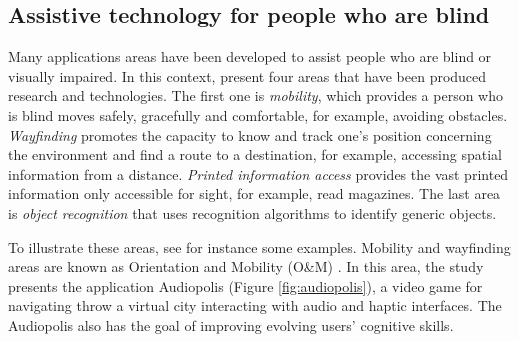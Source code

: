 \subsection{Assistive technology for people who are blind}
\label{subsec:background-assistive-technology}
Many applications areas have been developed to assist people who are blind or visually impaired. In this context,  present four areas that have been produced research and technologies. The first one is \textit{mobility}, which provides a person who is blind moves safely, gracefully and comfortable, for example, avoiding obstacles. \textit{Wayfinding} promotes the capacity to know and track one’s position concerning the environment and find a route to a destination, for example, accessing spatial information from a distance. \textit{Printed information access} provides the vast printed information only accessible for sight, for example, read magazines. The last area is \textit{object recognition} that uses recognition algorithms to identify generic objects.

To illustrate these areas, see for instance some examples. Mobility and wayfinding areas are known as Orientation and Mobility (O\&M) \cite{Wiener2010,Welch2016}. In this area, the study  presents the application Audiopolis (Figure \ref{fig:audiopolis}), a video game for navigating throw a virtual city interacting with audio and haptic interfaces. The Audiopolis also has the goal of improving evolving users' cognitive skills.

 	\begin{figure}[h] 
   	    \captionsetup{width=10cm}%
	\end{figure}

